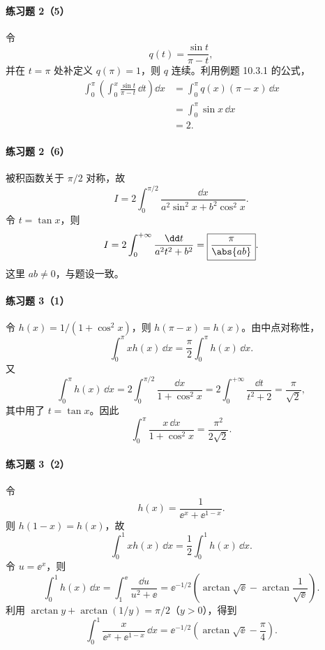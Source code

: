 \paragraph{练习题 2（5）}
\begin{xsolution}
令
\[
  q(t)=\frac{\sin t}{\pi-t},
\]
并在 $t=\pi$ 处补定义 $q(\pi)=1$，则 $q$ 连续。利用例题 10.3.1 的公式，
\begin{align*}
  \int_0^\pi\left(\int_0^x\frac{\sin t}{\pi-t}\,\dd t\right)\dd x
  &=\int_0^\pi q(x)(\pi-x)\,\dd x\\
  &=\int_0^\pi\sin x\,\dd x\\
  &=\boxed{2}.
\end{align*}
\end{xsolution}

\paragraph{练习题 2（6）}
\begin{xsolution}
被积函数关于 $\pi/2$ 对称，故
\[
  I=2\int_0^{\pi/2}\frac{\dd x}{a^2\sin^2x+b^2\cos^2x}.
\]
令 $t=\tan x$，则
\[
  I=2\int_0^{+\infty}\frac{\dd t}{a^2t^2+b^2}
  =\boxed{\frac\pi{\abs{ab}}}.
\]
这里 $ab\ne0$，与题设一致。
\end{xsolution}

\paragraph{练习题 3（1）}
\begin{xsolution}
令 $h(x)=1/(1+\cos^2x)$，则 $h(\pi-x)=h(x)$。由中点对称性，
\[
  \int_0^\pi xh(x)\,\dd x
  =\frac\pi2\int_0^\pi h(x)\,\dd x.
\]
又
\[
  \int_0^\pi h(x)\,\dd x
  =2\int_0^{\pi/2}\frac{\dd x}{1+\cos^2x}
  =2\int_0^{+\infty}\frac{\dd t}{t^2+2}
  =\frac\pi{\sqrt2},
\]
其中用了 $t=\tan x$。因此
\[
  \boxed{\int_0^\pi\frac{x\,\dd x}{1+\cos^2x}
  =\frac{\pi^2}{2\sqrt2}}.
\]
\end{xsolution}

\paragraph{练习题 3（2）}
\begin{xsolution}
令
\[
  h(x)=\frac1{\ee^x+\ee^{1-x}}.
\]
则 $h(1-x)=h(x)$，故
\[
  \int_0^1xh(x)\,\dd x=\frac12\int_0^1h(x)\,\dd x.
\]
令 $u=\ee^x$，则
\[
  \int_0^1h(x)\,\dd x
  =\int_1^{\ee}\frac{\dd u}{u^2+\ee}
  =\ee^{-1/2}\left(\arctan\sqrt{\ee}-\arctan\frac1{\sqrt\ee}\right).
\]
利用 $\arctan y+\arctan(1/y)=\pi/2$（$y>0$），得到
\[
  \boxed{\int_0^1\frac{x}{\ee^x+\ee^{1-x}}\,\dd x
  =\ee^{-1/2}\left(\arctan\sqrt{\ee}-\frac\pi4\right)}.
\]
\end{xsolution}

